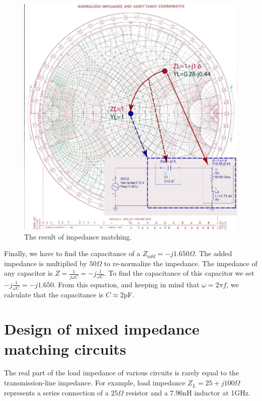 \documentclass{ximera}
\begin{document}
\begin{figure}[htbp]
\begin{center}
\includegraphics[scale=0.4]{../jpg/SimpleMatch-01small.jpg}
\end{center}
\caption{The result of impedance matching.}
\label{fig:SimpleMatch}
\end{figure}

Finally, we have to find the capacitance of a $Z_{add}=-j1.6 50 \Omega$. The added impedance is multiplied by $50 \Omega$ to re-normalize the impedance. The impedance of any capacitor is $Z=\frac{1}{j \omega C}=-j \frac{1}{\omega C}$. To find the capacitance of this capacitor we set $-j \frac{1}{\omega C}=-j1.6 50$. From this equation, and keeping in mind that $\omega = 2 \pi f$, we calculate that the capacitance is $C \approx 2$pF.



\section{Design of mixed impedance matching circuits}

The real part of the load impedance of various circuits is rarely equal to the transmission-line impedance. For example, load impedance $Z_L=25+j 100 \Omega$ represents a series connection of a $25\Omega$ resistor and a $7.96$nH inductor at 1GHz.
\end{document}
